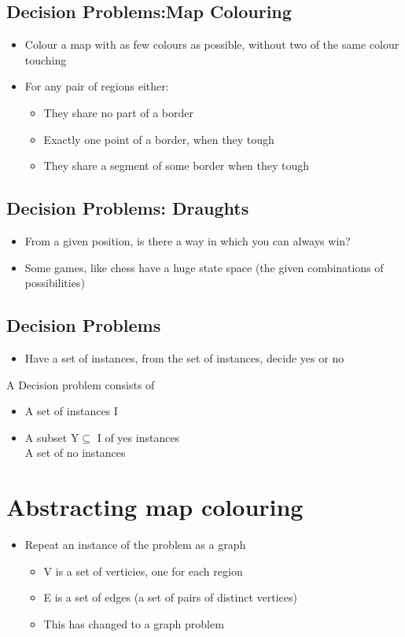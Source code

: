 \documentclass{article}[18pt]
\begin{document}
\subsection{Decision Problems:Map Colouring}
\begin{itemize}
\item Colour a map with as few colours as possible, without two of the same colour touching
\item For any pair of regions either:
\begin{itemize}
\item They share no part of a border
\item Exactly one point of a border, when they tough
\item They share a segment of some border when they tough
\end{itemize}
\end{itemize}
\subsection{Decision Problems: Draughts}
\begin{itemize}
\item From a given position, is there a way in which you can always win?
\item Some games, like chess have a huge state space (the given combinations of possibilities)
\end{itemize}
\subsection{Decision Problems}
\begin{itemize}
\item Have a set of instances, from the set of instances, decide yes or no
\end{itemize}
A Decision problem consists of
\begin{itemize}
\item A set of instances I
\item A subset Y$\subseteq$ I of yes instances\\
A set of no instances
\end{itemize}
\section{Abstracting map colouring}
\begin{itemize}
\item Repeat an instance of the problem as a graph
\begin{itemize}
\item V is a set of verticies, one for each region
\item E is a set of edges (a set of pairs of distinct vertices)
\item This has changed to a graph problem
\end{itemize}
\end{itemize}
\end{document}
